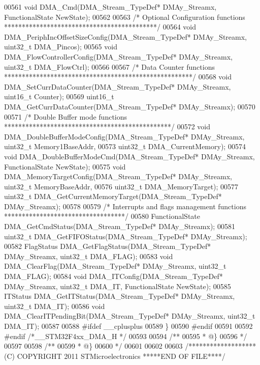 \begin{DoxyCode}
00561 \textcolor{keywordtype}{void} DMA_Cmd(DMA\_Stream\_TypeDef* DMAy\_Streamx, FunctionalState NewState);
00562 
00563 \textcolor{comment}{/* Optional Configuration functions *******************************************/}
00564 \textcolor{keywordtype}{void} DMA_PeriphIncOffsetSizeConfig(DMA\_Stream\_TypeDef* DMAy\_Streamx, uint32\_t DMA\_Pincos);
00565 \textcolor{keywordtype}{void} DMA_FlowControllerConfig(DMA\_Stream\_TypeDef* DMAy\_Streamx, uint32\_t DMA\_FlowCtrl);
00566 
00567 \textcolor{comment}{/* Data Counter functions *****************************************************/}
00568 \textcolor{keywordtype}{void} DMA_SetCurrDataCounter(DMA\_Stream\_TypeDef* DMAy\_Streamx, uint16\_t Counter);
00569 uint16\_t DMA_GetCurrDataCounter(DMA\_Stream\_TypeDef* DMAy\_Streamx);
00570 
00571 \textcolor{comment}{/* Double Buffer mode functions ***********************************************/}
00572 \textcolor{keywordtype}{void} DMA_DoubleBufferModeConfig(DMA\_Stream\_TypeDef* DMAy\_Streamx, uint32\_t Memory1BaseAddr,
00573                                 uint32\_t DMA\_CurrentMemory);
00574 \textcolor{keywordtype}{void} DMA_DoubleBufferModeCmd(DMA\_Stream\_TypeDef* DMAy\_Streamx, FunctionalState NewState);
00575 \textcolor{keywordtype}{void} DMA_MemoryTargetConfig(DMA\_Stream\_TypeDef* DMAy\_Streamx, uint32\_t MemoryBaseAddr,
00576                             uint32\_t DMA\_MemoryTarget);
00577 uint32\_t DMA_GetCurrentMemoryTarget(DMA\_Stream\_TypeDef* DMAy\_Streamx);
00578 
00579 \textcolor{comment}{/* Interrupts and flags management functions **********************************/}
00580 FunctionalState DMA_GetCmdStatus(DMA\_Stream\_TypeDef* DMAy\_Streamx);
00581 uint32\_t DMA_GetFIFOStatus(DMA\_Stream\_TypeDef* DMAy\_Streamx);
00582 FlagStatus DMA_GetFlagStatus(DMA\_Stream\_TypeDef* DMAy\_Streamx, uint32\_t DMA\_FLAG);
00583 \textcolor{keywordtype}{void} DMA_ClearFlag(DMA\_Stream\_TypeDef* DMAy\_Streamx, uint32\_t DMA\_FLAG);
00584 \textcolor{keywordtype}{void} DMA_ITConfig(DMA\_Stream\_TypeDef* DMAy\_Streamx, uint32\_t DMA\_IT, FunctionalState NewState);
00585 ITStatus DMA_GetITStatus(DMA\_Stream\_TypeDef* DMAy\_Streamx, uint32\_t DMA\_IT);
00586 \textcolor{keywordtype}{void} DMA_ClearITPendingBit(DMA\_Stream\_TypeDef* DMAy\_Streamx, uint32\_t DMA\_IT);
00587 
00588 \textcolor{preprocessor}{#}\textcolor{preprocessor}{ifdef} \_\_cplusplus
00589 \}
00590 \textcolor{preprocessor}{#}\textcolor{preprocessor}{endif}
00591 
00592 \textcolor{preprocessor}{#}\textcolor{preprocessor}{endif} \textcolor{comment}{/*\_\_STM32F4xx\_DMA\_H */}
00593 
00594 \textcolor{comment}{/**}
00595 \textcolor{comment}{  * @\}}
00596 \textcolor{comment}{  */}
00597 
00598 \textcolor{comment}{/**}
00599 \textcolor{comment}{  * @\}}
00600 \textcolor{comment}{  */}
00601 
00602 
00603 \textcolor{comment}{/******************* (C) COPYRIGHT 2011 STMicroelectronics *****END OF FILE****/}
\end{DoxyCode}
